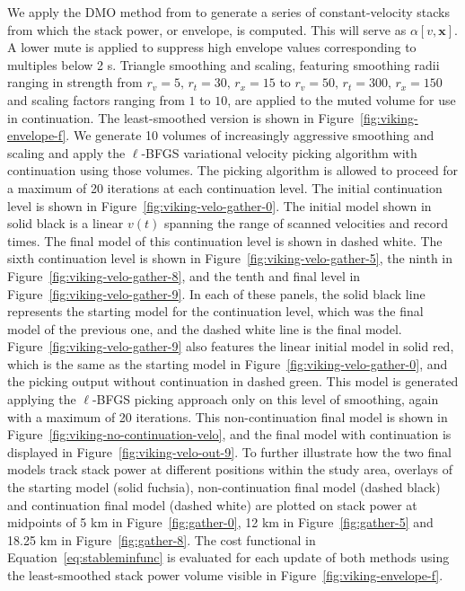 We apply the DMO method from \cite{fowler-1988} to generate a series of constant-velocity stacks from which the stack power, or envelope, is computed.  This will serve as $\alpha[v,\mathbf{x}]$.  A lower mute is applied to suppress high envelope values corresponding to multiples below 2 s.   Triangle smoothing and scaling, featuring smoothing radii ranging in strength from $r_v=5,\,r_t=30,\,r_x=15$ to $r_v=50,\,r_t=300,\,r_x=150$ and scaling factors ranging from $1$ to $10$, are applied to the muted volume for use in continuation.  The least-smoothed version is shown in Figure~\ref{fig:viking-envelope-f}.  We generate 10 volumes of increasingly aggressive smoothing and scaling and apply the $\ell$-BFGS variational velocity picking algorithm with continuation using those volumes. The picking algorithm is allowed to proceed for a maximum of 20 iterations at each continuation level.  The initial continuation level is shown in Figure~\ref{fig:viking-velo-gather-0}.  The initial model shown in solid black is a linear $v(t)$ spanning the range of scanned velocities and record times.  The final model of this continuation level is shown in dashed white.  The sixth continuation level is shown in Figure~\ref{fig:viking-velo-gather-5}, the ninth in Figure~\ref{fig:viking-velo-gather-8}, and the tenth and final level in Figure~\ref{fig:viking-velo-gather-9}. In each of these panels, the solid black line represents the starting model for the continuation level, which was the final model of the previous one, and the dashed white line is the final model.  Figure~\ref{fig:viking-velo-gather-9} also features the linear initial model in solid red, which is the same as the starting model in Figure~\ref{fig:viking-velo-gather-0}, and the picking output without continuation in dashed green.  This model is generated applying the $\ell$-BFGS picking approach only on this level of smoothing, again with a maximum of 20 iterations. This non-continuation final model is shown in Figure~\ref{fig:viking-no-continuation-velo}, and the final model with continuation is displayed in Figure~\ref{fig:viking-velo-out-9}.  To further illustrate how the two final models track stack power at different positions within the study area, overlays of the starting model (solid fuchsia), non-continuation final model (dashed black) and continuation final model (dashed white) are plotted on stack power at midpoints of 5 km in Figure~\ref{fig:gather-0}, 12 km in Figure~\ref{fig:gather-5} and 18.25 km in Figure~\ref{fig:gather-8}. The cost functional in Equation~\ref{eq:stableminfunc} is evaluated for each update of both methods using the least-smoothed stack power volume visible in Figure~\ref{fig:viking-envelope-f}. %

